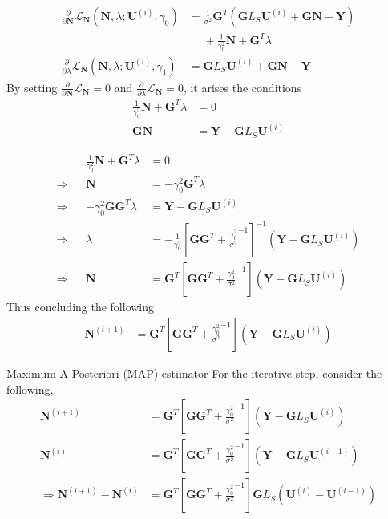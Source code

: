 \documentclass[progressbar=head]{beamer}
\newcommand{\ppar}[1]{ \left( #1 \right) }
\newcommand{\spar}[1]{ \left[ #1 \right] }
\newcommand{\Y}{\mathbf{Y}}
\newcommand{\G}{\mathbf{G}}
\newcommand{\U}{\mathbf{U}}
\newcommand{\N}{\mathbf{N}}
\begin{document}
\begin{frame}
\begin{align*}
\frac{\partial}{\partial \N}
\mathscr{L}_\N \ppar{\N, \lambda; \U^{(i)}, \gamma_0}
    &=
    \frac{1}{\sigma^2}
    \G^T
    \ppar{\G L_S \U^{(i)} + \G \N - \Y}
    \\
    &\phantom{=}
    +
    \frac{1}{\gamma_0^2} {\N}
    +
    \G^T \lambda
    \\
    \frac{\partial}{\partial \lambda} 
    \mathscr{L}_\N \ppar{\N, \lambda; \U^{(i)}, \gamma_1}
    &=
    \G L_S \U^{(i)} + \G \N - \Y
\end{align*}
By setting $\frac{\partial}{\partial \N} \mathscr{L}_\N = 0$ and 
$\frac{\partial}{\partial \lambda} \mathscr{L}_\N = 0$, it arises the conditions
\begin{align*}
    {\frac{1}{\gamma_0^2} { \N}
    +
    \G^T \lambda} &= 0
    \\
    \G \N 
    &= \Y - \G L_S \U^{(i)} 
\end{align*}
\end{frame}

\begin{frame}
\begin{align*}
&&
{\frac{1}{\gamma_0^2} { \N}
    +
    \G^T \lambda} &= 0
\\
\Rightarrow
&&
\N &= -\gamma_0^2 \G^T \lambda
\\
\Rightarrow
&&
-\gamma_0^2 \G \G^T \lambda
&=
\Y - \G L_S \U^{(i)} 
\\
\Rightarrow
&&
\lambda &=
-\frac{1}{\gamma_0^2} \spar{\G \G^T+ \frac{\gamma_0^2}{\sigma^2}^{-1}}^{-1} \ppar{\Y - \G L_S \U^{(i)} }
\\
\Rightarrow
&&
\N &=
\G^T \spar{\G \G^T+ \frac{\gamma_0^2}{\sigma^2}^{-1}} \ppar{\Y - \G L_S \U^{(i)} }
\end{align*}
Thus concluding the following
\begin{align*}
\N^{(i+1)} &=
\G^T \spar{\G \G^T+ \frac{\gamma_0^2}{\sigma^2}^{-1}} \ppar{\Y - \G L_S \U^{(i)} }
\end{align*}
\end{frame}

\begin{frame}{Maximum A Posteriori (MAP) estimator}
For the iterative step, consider the following,
\begin{align*}
\N^{(i+1)} &=
\G^T \spar{\G \G^T+ \frac{\gamma_0^2}{\sigma^2}^{-1}} \ppar{\Y - \G L_S \U^{(i)} }
\\
\N^{(i)} &=
\G^T \spar{\G \G^T+ \frac{\gamma_0^2}{\sigma^2}^{-1}} \ppar{\Y - \G L_S \U^{(i-1)} }
\\
\Rightarrow
\N^{(i+1)}-\N^{(i)} &=
\G^T \spar{\G \G^T+ \frac{\gamma_0^2}{\sigma^2}^{-1}} \G L_S \ppar{ \U^{(i)}-\U^{(i-1)} }
\end{align*}
\end{frame}
\end{document}
